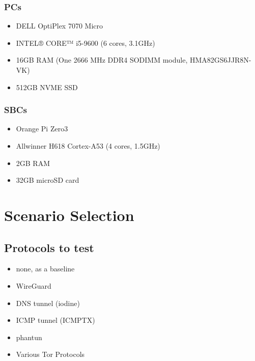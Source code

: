 \subsubsection{PCs}
\begin{itemize}
  \item DELL OptiPlex 7070 Micro
  \item INTEL® CORE™ i5-9600 (6 cores, 3.1GHz)
  \item 16GB RAM (One 2666 MHz DDR4 SODIMM module, HMA82GS6JJR8N-VK)
  \item 512GB NVME SSD
\end{itemize}

\subsubsection{SBCs}
\begin{itemize}
  \item Orange Pi Zero3
  \item Allwinner H618 Cortex-A53 (4 cores, 1.5GHz)
  \item 2GB RAM
  \item 32GB microSD card
\end{itemize}

\section{Scenario Selection}
\subsection{Protocols to test}
\begin{itemize}
  \item none, as a baseline
  \item WireGuard
  \item DNS tunnel (iodine)
  \item ICMP tunnel (ICMPTX)
  \item phantun
  \item Various Tor Protocols
\end{itemize}


